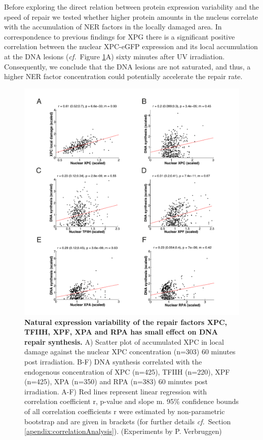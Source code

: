 Before exploring the direct relation between protein expression variability and the speed of repair we tested whether higher protein amounts in the nucleus correlate with the accumulation of NER factors in the locally damaged area. In correspondence to previous findings for XPG \cite{Luijsterburg2010} there is a significant positive correlation between the nuclear XPC-eGFP expression and its local accumulation at the DNA lesions (\textit{cf.}\ Figure \ref{fig:Nuc_vs_DNAsynthesis}A) sixty minutes after UV irradiation. Consequently, we conclude that the DNA lesions are not saturated, and thus, a higher NER factor concentration could potentially accelerate the repair rate.\\
\begin{figure}[h!]
	\begin{center}
		\includegraphics[width=1\textwidth]{Abbildungen/figure3_3.pdf}
		\caption{\textbf{Natural expression variability of the repair factors XPC, TFIIH, XPF, XPA and RPA has small effect on DNA repair synthesis.} A) Scatter plot of accumulated XPC in local damage against the nuclear XPC concentration (n=303) 60 minutes post irradiation. B-F) DNA synthesis correlated with the endogenous concentration of XPC (n=425), TFIIH (n=220), XPF (n=425), XPA (n=350) and RPA (n=383) 60 minutes post irradiation. A-F) Red lines represent linear regression with correlation coefficient r, p-value and slope m. 95\% confidence bounds of all correlation coefficients r were estimated by non-parametric bootstrap and are given in brackets (for further details \textit{cf.}\ Section \ref{apendix:correlationAnalysis}). (Experiments by P. Verbruggen)}
		\label{fig:Nuc_vs_DNAsynthesis}
	\end{center}
\end{figure}

